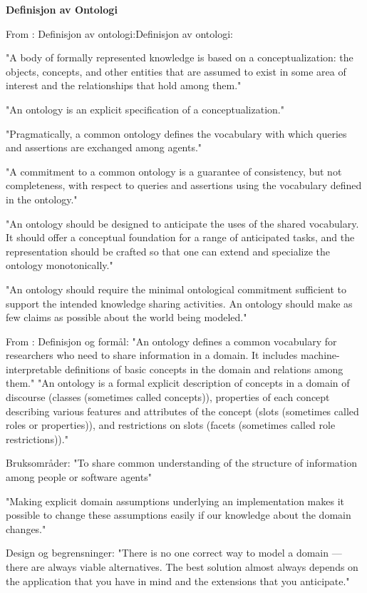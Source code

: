\textbf{Definisjon av Ontologi}

From \parencite{gruber1995toward_principles_design_ontologies_used_knowledge_sharing} :
Definisjon av ontologi:Definisjon av ontologi:

"A body of formally represented knowledge is based on a conceptualization: the objects, concepts, and other entities that are assumed to exist in some area of interest and the relationships that hold among them."

"An ontology is an explicit specification of a conceptualization."

"Pragmatically, a common ontology defines the vocabulary with which queries and assertions are exchanged among agents."

"A commitment to a common ontology is a guarantee of consistency, but not completeness, with respect to queries and assertions using the vocabulary defined in the ontology."

"An ontology should be designed to anticipate the uses of the shared vocabulary. It should offer a conceptual foundation for a range of anticipated tasks, and the representation should be crafted so that one can extend and specialize the ontology monotonically."

"An ontology should require the minimal ontological commitment sufficient to support the intended knowledge sharing activities. An ontology should make as few claims as possible about the world being modeled."

From \parencite{noy2001ontology_development_101_guide_creating_first_ontology} :
Definisjon og formål:
"An ontology defines a common vocabulary for researchers who need to share information in a domain. It includes machine-interpretable definitions of basic concepts in the domain and relations among them."
"An ontology is a formal explicit description of concepts in a domain of discourse (classes (sometimes called concepts)), properties of each concept describing various features and attributes of the concept (slots (sometimes called roles or properties)), and restrictions on slots (facets (sometimes called role restrictions))."

Bruksområder:
"To share common understanding of the structure of information among people or software agents"

"Making explicit domain assumptions underlying an implementation makes it possible to change these assumptions easily if our knowledge about the domain changes."

Design og begrensninger:
"There is no one correct way to model a domain — there are always viable alternatives. The best solution almost always depends on the application that you have in mind and the extensions that you anticipate."

